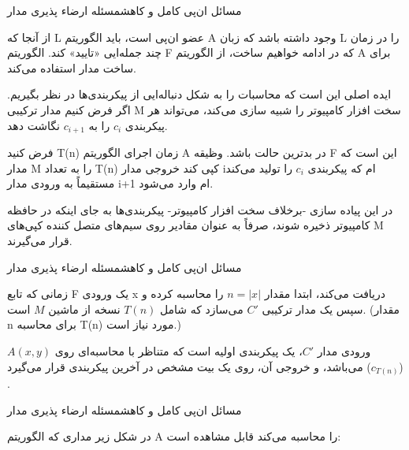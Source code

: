 \begin{itemframe-s}{مسائل ان‌پی کامل و کاهش}{مسئله ارضاء پذیری مدار}
\item[-]
از آنجا که L عضو ان‌پی است، باید الگوریتم A وجود داشته باشد که زبان L را در زمان چند جمله‌ایی «تایید» کند. الگوریتم F که در ادامه خواهیم ساخت، از الگوریتم A برای ساخت مدار استفاده می‌کند.
\item[-]
ایده اصلی این است که محاسبات را به شکل دنباله‌ایی از پیکربندی‌ها در نظر بگیریم. اگر فرض کنیم مدار ترکیبی M سخت افزار کامپیوتر را شبیه سازی می‌کند، می‌تواند هر پیکربندی $c_i$ را به $ c_{i+1}$ نگاشت دهد.
\item[-]
فرض کنید T(n) زمان اجرای الگوریتم A  در بدترین حالت باشد. وظیقه F این است که مدار M را به تعداد T(n) کپی کند خروجی مدار iام که پیکربندی $c_i$ را تولید می‌کند مستقیماً به ورودی مدار i+1 ام وارد می‌شود.
\item[-]
در این پیاده سازی -برخلاف سخت افزار کامپیوتر- پیکربندی‌ها به جای اینکه در حافظه کامپیوتر ذخیره شوند، صرفاً به عنوان مقادیر روی سیم‌های متصل کننده کپی‌های M قرار می‌گیرند.
\end{itemframe-s}


\begin{itemframe-s}{مسائل ان‌پی کامل و کاهش}{مسئله ارضاء پذیری مدار}
\item[-]
زمانی که تابع F یک ورودی x دریافت می‌کند، ابتدا مقدار
 $n = |x|$
را محاسبه کرده و سپس یک مدار ترکیبی $C'$ می‌سازد که شامل $T(n)$ نسخه از ماشین $M$ است. (مقدار n برای محاسبه T(n) مورد نیاز است.)
\item[-]
ورودی مدار $C'$، یک پیکربندی اولیه است که متناظر با محاسبه‌ای روی $A(x, y)$ می‌باشد، و خروجی آن، روی یک بیت مشخص در آخرین پیکربندی قرار می‌گیرد ($c_{T(n)}$) .

\end{itemframe-s}


\begin{itemframe-s}{مسائل ان‌پی کامل و کاهش}{مسئله ارضاء پذیری مدار}
\item [-]
در شکل زیر مداری که الگوریتم A را محاسبه می‌کند قابل مشاهده است:

\end{itemframe-s}



